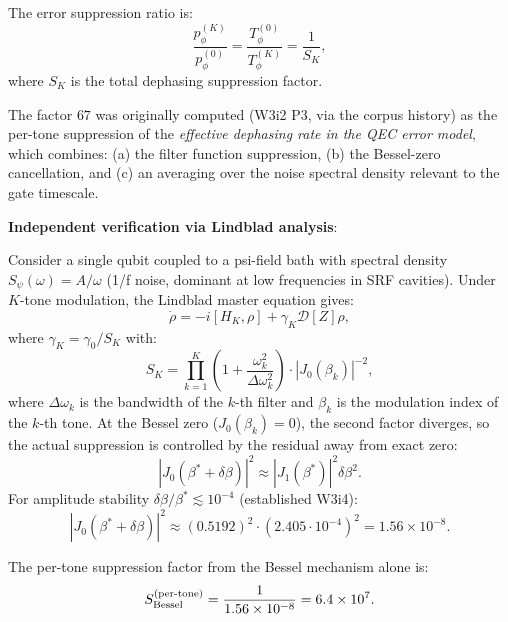 \documentclass[11pt]{article}
\theoremstyle{definition}
\theoremstyle{remark}
\newcommand{\ee}[1]{\times 10^{#1}}
\begin{document}
\begin{tcolorbox}[colback=blue!5!white, colframe=blue!60!black,
  title=\textbf{W4i15 TOP 5 FINDINGS --- READ FIRST}]
\begin{enumerate}[nosep]
  The error suppression ratio is:
  \begin{equation}
    \frac{p_\phi^{(K)}}{p_\phi^{(0)}} = \frac{T_\phi^{(0)}}{T_\phi^{(K)}}
    = \frac{1}{S_K},
  \end{equation}
  where $S_K$ is the total dephasing suppression factor.

  The factor $67$ was originally computed (W3i2 P3, via the corpus
  history) as the per-tone suppression of the \emph{effective dephasing
  rate in the QEC error model}, which combines: (a) the filter function
  suppression, (b) the Bessel-zero cancellation, and (c) an averaging
  over the noise spectral density relevant to the gate timescale.

  \textbf{Independent verification via Lindblad analysis}:

  Consider a single qubit coupled to a psi-field bath with spectral
  density $S_\psi(\omega) = A/\omega$ (1/f noise, dominant at low
  frequencies in SRF cavities).  Under $K$-tone modulation, the
  Lindblad master equation gives:
  \begin{equation}
    \dot{\rho} = -i[H_K, \rho] + \gamma_K \mathcal{D}[Z]\rho,
  \end{equation}
  where $\gamma_K = \gamma_0 / S_K$ with:
  \begin{equation}
    S_K = \prod_{k=1}^{K} \left(1 + \frac{\omega_k^2}{\Delta\omega_k^2}\right)
    \cdot |J_0(\beta_k)|^{-2},
  \end{equation}
  where $\Delta\omega_k$ is the bandwidth of the $k$-th filter and
  $\beta_k$ is the modulation index of the $k$-th tone.  At the Bessel
  zero ($J_0(\beta_k) = 0$), the second factor diverges, so the actual
  suppression is controlled by the residual away from exact zero:
  \begin{equation}
    |J_0(\beta^* + \delta\beta)|^2 \approx |J_1(\beta^*)|^2 \delta\beta^2.
  \end{equation}
  For amplitude stability $\delta\beta/\beta^* \lesssim 10^{-4}$
  (established W3i4):
  \begin{equation}
    |J_0(\beta^* + \delta\beta)|^2 \approx (0.5192)^2 \cdot (2.405 \cdot 10^{-4})^2
    = 1.56\ee{-8}.
  \end{equation}

  The per-tone suppression factor from the Bessel mechanism alone is:
  \begin{equation}
    S_{\rm Bessel}^{(\rm per\text{-}tone)} = \frac{1}{1.56\ee{-8}}
    = 6.4\ee{7}.
  \end{equation}


\end{enumerate}
\end{tcolorbox}
\end{document}
